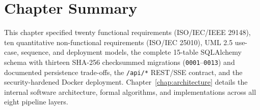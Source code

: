 \section{Chapter Summary}

This chapter specified twenty functional requirements (ISO/IEC/IEEE 29148), ten quantitative non-functional requirements (ISO/IEC 25010), UML 2.5 use-case, sequence, and deployment models, the complete 15-table SQLAlchemy schema with thirteen SHA-256 checksummed migrations (\texttt{0001}--\texttt{0013}) and documented persistence trade-offs, the \texttt{/api/*} REST/SSE contract, and the security-hardened Docker deployment. Chapter~\ref{chap:architecture} details the internal software architecture, formal algorithms, and implementations across all eight pipeline layers.
